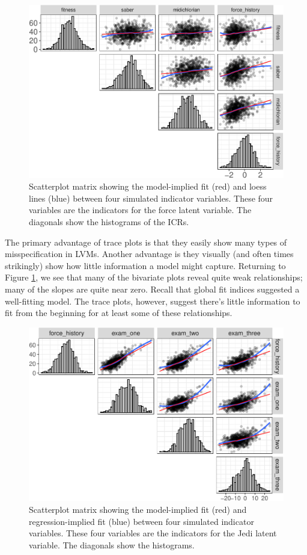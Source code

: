 \documentclass[
  english,
  doc]{apa6}
\begin{document}
\begin{figure}
\centering
\includegraphics{flexplavaan_draft_files/figure-latex/traceMatrix-1.pdf}
\caption{\label{fig:traceMatrix}Scatterplot matrix showing the model-implied fit (red) and loess lines (blue) between four simulated indicator variables. These four variables are the indicators for the force latent variable. The diagonals show the histograms of the ICRs.}
\end{figure}

The primary advantage of trace plots is that they easily show many types of misspecification in LVMs. Another advantage is they visually (and often times strikingly) show how little information a model might capture. Returning to Figure \ref{fig:traceMatrix}, we see that many of the bivariate plots reveal quite weak relationships; many of the slopes are quite near zero. Recall that global fit indices suggested a well-fitting model. The trace plots, however, suggest there's little information to fit from the beginning for at least some of these relationships.

\begin{figure}
\centering
\includegraphics{flexplavaan_draft_files/figure-latex/traceMatrix2-1.pdf}
\caption{\label{fig:traceMatrix2}Scatterplot matrix showing the model-implied fit (red) and regression-implied fit (blue) between four simulated indicator variables. These four variables are the indicators for the Jedi latent variable. The diagonals show the histograms.}
\end{figure}
\end{document}
